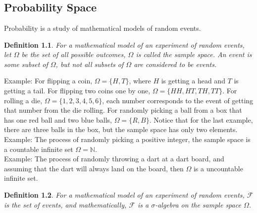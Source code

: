 \documentclass[11pt]{book}
\theoremstyle{break}
\theoremstyle{break}
\newtheorem{defn}{Definition}[corL]
\newcommand{\N}{\mathbb{N}}
\newcommand{\example}{\color{green}Example: \color{black}}
\begin{document}
\newpage 
\tableofcontents
{}

\newpage
\setcounter{page}{1}
\vspace*{\fill}


\newpage


\chapter{}
\section[Probability Space]{\color{red} Probability Space\color{black}}
Probability is a study of mathematical models of random events. 
\begin{defn}
For a mathematical model of an experiment of random events, let $\Omega$ be the set of all possible outcomes, $\Omega$ is called the sample space. An event is some subset of $\Omega$, but not all subsets of $\Omega$ are considered to be events. 
\end{defn}
\example For flipping a coin, $\Omega = \{H, T\}$, where $H$ is getting a head and $T$ is getting a tail. For flipping two coins one by one, $\Omega = \{ HH, HT, TH, TT\}$. For rolling a die, $\Omega = \{ 1,2,3,4,5,6\}$, each number corresponds to the event of getting that number from the die rolling. For randomly picking a ball from a box that has one red ball and two blue balls, $\Omega = \{ R,B\}$. Notice that for the last example, there are three balls in the box, but the sample space has only two elements.\\

\example The process of randomly picking a positive integer, the sample space is a countable infinite set $\Omega = \N$.\\

\example The process of randomly throwing a dart at a dart board, and assuming that the dart will always land on the board, then $\Omega$ is a uncountable infinite set.\\

\begin{defn}
For a mathematical model of an experiment of random events, $\mathcal{F}$ is the set of events, and mathematically, $\mathcal{F}$ is a $\sigma$-algebra on the sample space $\Omega$. 
\end{defn}
\end{document}
